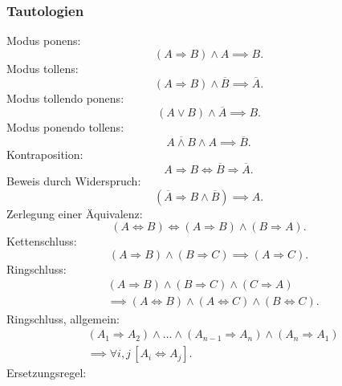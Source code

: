 \subsubsection{Tautologien}
Modus ponens:
\begin{equation}
(A\Rightarrow B)\land A\implies B.
\end{equation}
Modus tollens:
\begin{equation}
(A\Rightarrow B)\land\overline B\implies\overline A.
\end{equation}
Modus tollendo ponens:
\begin{equation}
(A\lor B)\land\overline A \implies B.
\end{equation}
Modus ponendo tollens:
\begin{equation}
\overline{A\land B}\land A\implies\overline B.
\end{equation}
Kontraposition:
\begin{equation}
A\Rightarrow B \iff \overline B\Rightarrow \overline A.
\end{equation}
Beweis durch Widerspruch:
\begin{equation}
(\overline A\Rightarrow B\land\overline B)\implies A.
\end{equation}
Zerlegung einer Äquivalenz:
\begin{equation}
(A\Leftrightarrow B) \iff (A\Rightarrow B)\land(B\Rightarrow A).
\end{equation}
Kettenschluss:
\begin{equation}
(A\Rightarrow B)\land(B\Rightarrow C)\implies (A\Rightarrow C).
\end{equation}
Ringschluss:
\begin{equation}
\begin{split}
&(A\Rightarrow B)\land (B\Rightarrow C)\land(C\Rightarrow A)\\
&\implies (A\Leftrightarrow B)\land(A\Leftrightarrow C)\land(B\Leftrightarrow C).
\end{split}
\end{equation}
Ringschluss, allgemein:
\begin{equation}
\begin{split}
& (A_1{\Rightarrow }A_2)\land\ldots\land(A_{n-1}{\Rightarrow}A_n)
\land(A_n{\Rightarrow}A_1)\\
& \implies \forall i,j\,[A_i\Leftrightarrow A_j].
\end{split}
\end{equation}
Ersetzungsregel:

